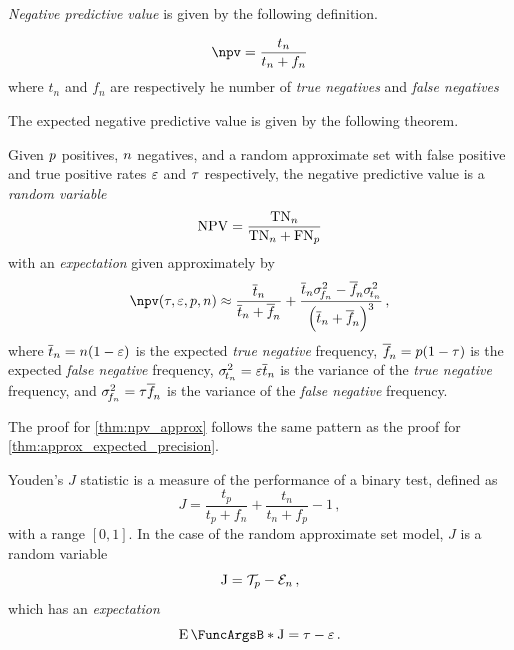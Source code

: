 \documentclass[10pt,final,hidelinks]{article}
\numberwithin{equation}{section}
\begin{document}
\emph{Negative predictive value} is given by the following definition.
\begin{definition}
	\begin{equation}
	\npv = \frac{t_n}{t_n + f_n}
	\end{equation}
	where $t_n$ and $f_n$ are respectively he number of \emph{true negatives} 
	and \emph{false negatives} 
\end{definition}
The expected negative predictive value is given by the following theorem.
\begin{theorem}
	\label{thm:npv_approx}
	Given $p$ positives, $n$ negatives, and a random approximate set with false positive and true positive rates $\varepsilon$ and $\tau$ respectively, the negative predictive value is a \emph{random variable}
	\begin{equation}
	\mathrm{NPV} = \frac{\mathrm{TN}_{n}}{\mathrm{TN}_{n} + \mathrm{FN}_{p}}
	\end{equation}
	with an \emph{expectation} given approximately by
	\begin{equation}
	\label{eq:npv_approx}
	\npv(\tprate, \fprate , \p, \n) \approx 
	\frac{\overline{t}_n}{\overline{t}_n + \overline{f}_{\!n}} +
	\frac{\overline{t}_n \sigma_{\!f_n}^2 - \overline{f}_{\!n} 
		\sigma_{\!t_n}^2}{\left(\overline{t}_n + \overline{f}_{\!n}\right)^3}\,,
	\end{equation}
	where $\overline{t}_n = n(1-\varepsilon)$ is the expected \emph{true negative} frequency, $\overline{f}_{\!n} =  p(1-\tau)$ is the expected \emph{false negative} frequency, $\sigma_{\!t_n}^2 = \varepsilon \overline{t}_n$ is the variance of the \emph{true negative} frequency, and $\sigma_{\!f_n}^2 = \tau\overline{f}_{\!n}$ is the variance of the \emph{false negative} frequency.
\end{theorem}
The proof for \cref{thm:npv_approx} follows the same pattern as the proof for \cref{thm:approx_expected_precision}.

Youden's $J$ statistic is a measure of the performance of a binary test, defined as
\begin{equation}
J = \frac{t_p}{t_p + f_n} + \frac{t_n}{t_n + f_p} - 1\,,
\end{equation}
with a range $[0,1]$.
In the case of the random approximate set model, $J$ is a random variable
\begin{equation}
\mathrm{J} = \mathcal{T}_p - \mathcal{E}_n\,,
\end{equation}
which has an \emph{expectation}
\begin{equation}
\Expect{\RV{J}} = \tprate - \fprate\,.
\end{equation}
\end{document}
